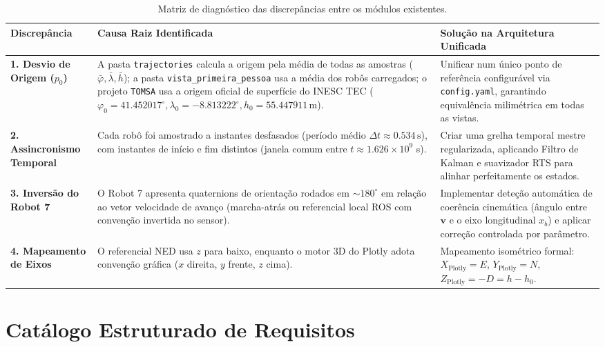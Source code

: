 \documentclass[11pt,a4paper]{article}
\newcommand{\vv}[1]{\mathbf{#1}}
\begin{document}
\begin{table}[H]
\centering
\small
\begin{tabular}{lp{6.2cm}p{6.8cm}}
\toprule
\textbf{Discrepância} & \textbf{Causa Raiz Identificada} & \textbf{Solução na Arquitetura Unificada} \\
\midrule
\textbf{1. Desvio de Origem ($p_0$)} & A pasta \texttt{trajectories} calcula a origem pela média de todas as amostras ($\bar{\varphi}, \bar{\lambda}, \bar{h}$); a pasta \texttt{vista\_primeira\_pessoa} usa a média dos robôs carregados; o projeto \texttt{TOMSA} usa a origem oficial de superfície do INESC TEC ($\varphi_0=41.452017^\circ, \lambda_0=-8.813222^\circ, h_0=55.447911\,\text{m}$). & Unificar num único ponto de referência configurável via \texttt{config.yaml}, garantindo equivalência milimétrica em todas as vistas. \\
\addlinespace
\textbf{2. Assincronismo Temporal} & Cada robô foi amostrado a instantes desfasados (período médio $\Delta t \approx 0.534\,\text{s}$), com instantes de início e fim distintos (janela comum entre $t \approx 1.626\times 10^9$ s). & Criar uma grelha temporal mestre regularizada, aplicando Filtro de Kalman e suavizador RTS para alinhar perfeitamente os estados. \\
\addlinespace
\textbf{3. Inversão do Robot 7} & O Robot 7 apresenta quaternions de orientação rodados em $\sim 180^\circ$ em relação ao vetor velocidade de avanço (marcha-atrás ou referencial local ROS com convenção invertida no sensor). & Implementar deteção automática de coerência cinemática (ângulo entre $\vv{v}$ e o eixo longitudinal $x_b$) e aplicar correção controlada por parâmetro. \\
\addlinespace
\textbf{4. Mapeamento de Eixos} & O referencial NED usa $z$ para baixo, enquanto o motor 3D do Plotly adota convenção gráfica ($x$ direita, $y$ frente, $z$ cima). & Mapeamento isométrico formal: $X_{\text{Plotly}} = E$, $Y_{\text{Plotly}} = N$, $Z_{\text{Plotly}} = -D = h - h_0$. \\
\bottomrule
\end{tabular}
\caption{Matriz de diagnóstico das discrepâncias entre os módulos existentes.}
\end{table}

\section{Catálogo Estruturado de Requisitos}
\end{document}
